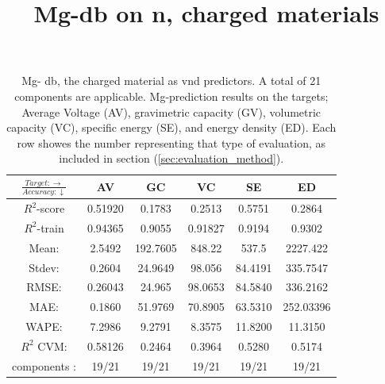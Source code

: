 \begin{table}[h]
\normalsize
\centering
\caption{Mg- db, the charged material as vnd predictors. A total of 21 components are applicable. Mg-prediction results on the targets; Average Voltage (AV), gravimetric capacity (GV), volumetric capacity (VC), specific energy (SE), and energy density (ED). Each row showes the number representing that type of evaluation, as included in section (\ref{sec:evaluation_method}). } 
\title{Mg-db on n, charged materials}
\begin{tabular}{|c|c|c|c|c|c|}
	\hline 
	$\frac{Target: \rightarrow}{Accuracy:\downarrow} $ & AV & GC & VC & SE & ED 
	 \\ 
	\hline
	$R^2$-score 	& 0.51920 & 0.1783 	& 0.2513 & 0.5751 &   0.2864\\ 
	\hline 
	$R^2$-train 	& 0.94365 & 0.9055 	& 0.91827 & 0.9194 & 0.9302 \\ 
	\hline
	Mean: 		& 2.5492 &192.7605	&848.22	&537.5&2227.422\\
	\hline 
	Stdev: 		& 0.2604 &24.9649	&98.056&84.4191&335.7547\\
	\hline		
	RMSE:		 & 0.26043& 24.965 &  98.0653 &  84.5840 &336.2162 \\ 
	\hline
	MAE: 		& 0.1860 & 51.9769& 70.8905 & 63.5310 & 252.03396 \\ 
	\hline
	WAPE:		& 7.2986 & 9.2791 & 8.3575  & 11.8200 & 11.3150 \\
	\hline
	$R^2$ CVM: 	& 0.58126 &  0.2464 & 0.3964  & 0.5280 &0.5174 \\
	\hline
	components :	& 19/21 & 19/21 & 19/21  & 19/21 &19/21 \\
	\hline
\end{tabular}
\label{tab:mg-n-i}
\end{table}


